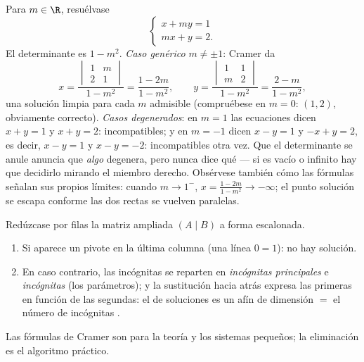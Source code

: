 \begin{example}
\label{ex:b1:det:cramerparameter}
Para $m \in \R$, resuélvase
\[
\begin{cases}
x + m y = 1\\
m x + y = 2 .
\end{cases}
\]
El determinante es $1 - m^2$. \emph{Caso genérico} $m \neq \pm1$:
Cramer da
\[
x = \frac{\begin{vmatrix} 1 & m\\ 2 & 1\end{vmatrix}}{1 - m^2}
= \frac{1 - 2m}{1 - m^2},
\qquad
y = \frac{\begin{vmatrix} 1 & 1\\ m & 2\end{vmatrix}}{1 - m^2}
= \frac{2 - m}{1 - m^2},
\]
una solución limpia para cada $m$ admisible (compruébese en $m = 0$:
$(1, 2)$, obviamente correcto). \emph{Casos degenerados}: en $m = 1$
las ecuaciones dicen $x + y = 1$ y $x + y = 2$: incompatibles; y en
$m = -1$ dicen $x - y = 1$ y $-x + y = 2$, es decir, $x - y = 1$ y
$x - y = -2$: incompatibles otra vez. Que el determinante se anule
anuncia que \emph{algo} degenera, pero nunca dice qué --- si es vacío
o infinito hay que decidirlo mirando el miembro derecho. Obsérvese
también cómo las fórmulas señalan sus propios límites: cuando
$m \to 1^{-}$, $x = \frac{1 - 2m}{1 - m^2} \to -\infty$; el punto
solución se escapa conforme las dos rectas se vuelven paralelas.
\end{example}

\begin{method}\label{met:b1:det:gauss}
Redúzcase por filas la matriz ampliada $(A \mid B)$ a forma
escalonada.
\begin{enumerate}
  \item Si aparece un pivote en la última columna (una línea
        $0 = 1$): no hay solución.
  \item En caso contrario, las incógnitas se reparten en
        \emph{incógnitas principales} e \emph{incógnitas
        } (los parámetros); y la sustitución hacia atrás
        expresa las primeras en función de las segundas: el 
        de soluciones es un  afín de dimensión $=$ el
        número de incógnitas .
\end{enumerate}
Las fórmulas de Cramer son para la teoría y los sistemas pequeños; la
eliminación es el algoritmo práctico.
\end{method}

